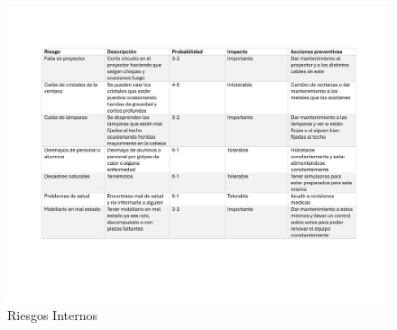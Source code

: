     \begin{figure}[H]
        \centering
        \includegraphics[scale=0.3]{13/img/riesgosInternos.pdf}
        \caption{Riesgos Internos}
    \end{figure}
